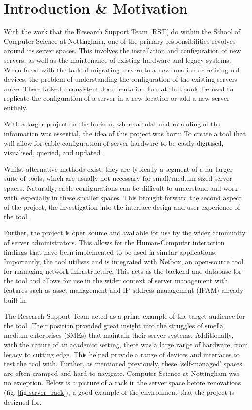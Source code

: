 \documentclass [11pt,a4paper]{article}
\begin{document}
\section{Introduction \& Motivation}
\label{sec:introduction}
With the work that the Research Support Team (RST) do within the School of Computer Science at Nottingham, one of the primary responsibilities revolves around its server spaces. This involves the installation and configuration of new servers, as well as the maintenance of existing hardware and legacy systems. When faced with the task of migrating servers to a new location or retiring old devices, the problem of understanding the configuration of the existing servers arose. There lacked a consistent documentation format that could be used to replicate the configuration of a server in a new location or add a new server entirely.

With a larger project on the horizon, where a total understanding of this information was essential, the idea of this project was born; To create a tool that will allow for cable configuration of server hardware to be easily digitised, visualised, queried, and updated.

Whilst alternative methods exist, they are typically a segment of a far larger suite of tools, which are usually not necessary for small/medium-sized server spaces. Naturally, cable configurations can be difficult to understand and work with, especially in these smaller spaces. This brought forward the second aspect of the project, the investigation into the interface design and user experience of the tool.

Further, the project is open source and available for use by the wider community of server administrators. This allows for the Human-Computer interaction findings that have been implemented to be used in similar applications. Importantly, the tool utilises and is integrated with Netbox\cite{Netbox}, an open-source tool for managing network infrastructure. This acts as the backend and database for the tool and allows for use in the wider context of server management with features such as asset management and IP address management (IPAM) already built in.

The Research Support Team acted as a prime example of the target audience for the tool. Their position provided great insight into the struggles of smella medium enterprises (SMEs) that maintain their server systems. Additionally, with the nature of an academic setting, there was a large range of hardware, from legacy to cutting edge. This helped provide a range of devices and interfaces to test the tool with. Further, as mentioned previously, these `self-managed' spaces are often cramped and hard to navigate. Computer Science at Nottingham was no exception. Below is a picture of a rack in the server space before renovations (fig. \ref{fig:server_rack}), a good example of the environment that the project is designed for.
\end{document}
